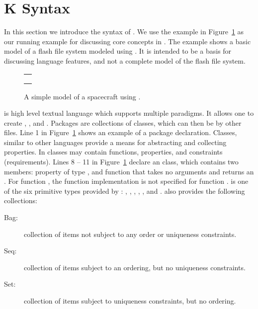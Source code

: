 \section{K Syntax}
\label{sec:k-syntax}

In this section we introduce the syntax of \Klang{}. We use the
\Klang{} example in Figure~\ref{fig:fs} as our running example for
discussing core concepts in \Klang{}. The example shows a basic model
of a flash file system modeled using \Klang{}. It is intended to be a
basis for discussing language features, and not a complete model of
the flash file system.

\begin{figure}
\centering
\begin{tabular}{c}
\hline \\
 \\ \\
\hline
\end{tabular}
\caption{A simple model of a spacecraft using \Klang{}.}
\label{fig:fs}
\end{figure}

\Klang{} is high level textual language which supports multiple
paradigms. It allows one to create , ,
and . Packages are collections of classes, which can
then be  by other \Klang{} files. Line 1 in
Figure~\ref{fig:fs} shows an example of a package
declaration. Classes, similar to other languages provide a means for
abstracting and collecting properties. In \Klang{} classes may contain
functions, properties, and constraints (requirements). Lines 8 -- 11
in Figure~\ref{fig:fs} declare an  class, which contains
two members: property  of type , and function
 that takes no arguments and returns an . For
function , the function implementation is not specified for
function .  is one of the six primitive types
provided by \Klang{}: , , ,
, , and . \Klang{} also provides
the following collections:

\begin{description}
\item [Bag:] collection of items not subject to any order
  or uniqueness constraints.
\item [Seq:] collection of items subject to an ordering, but
  no uniqueness constraints.
\item [Set:] collection of items subject to uniqueness
  constraints, but no ordering.
\end{description}

